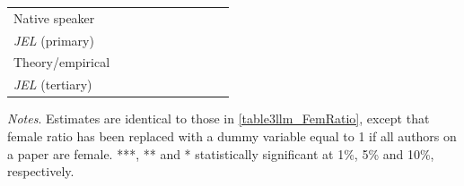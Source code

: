 \begin{table}
\begin{threeparttable}
\begin{tabular}{p{3cm}S@{}S@{}S@{}S@{}S@{}S@{}S@{}S@{}S@{}}
            Native speaker                &               &               &               &               &           {}   &           {}   &           {}   &           {}   &           {}   \\
            \textit{JEL} (primary)        &               &               &               &               &               &               &           {}   &               &               \\
            Theory/empirical              &               &               &               &               &               &               &               &           {}   &               \\
            \textit{JEL} (tertiary)       &               &               &               &               &               &               &               &               &           {}   \\
            \bottomrule
        \end{tabular}
        \begin{tablenotes}
            \tiny
            \item \textit{Notes}. Estimates are identical to those in \autoref{table3llm_FemRatio}, except that female ratio has been replaced with a dummy variable equal to 1 if all authors on a paper are female. ***, ** and * statistically significant at 1\%, 5\% and 10\%, respectively.
        \end{tablenotes}
    \end{threeparttable}
\end{table}